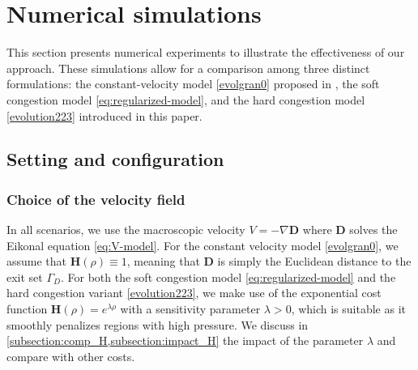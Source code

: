 \documentclass[final,reqno]{amsart}
\theoremstyle{plain}
\theoremstyle{definition}
\theoremstyle{remark}
\numberwithin{remark}{section}	%
\numberwithin{example}{section}	%
\newcommand{\de}{\mathbf{D}}
\newcommand{\he}{\mathbf{H}}
\begin{document}
 
\section{Numerical simulations}\label{sm_Hughes}
This section presents numerical experiments to illustrate the effectiveness of our approach. These simulations allow for a comparison among three distinct formulations: the constant-velocity model \eqref{evolgran0} proposed in \cite{ennaji2023prediction}, the soft congestion model \eqref{eq:regularized-model}, and the hard congestion model \eqref{evolution223} introduced in this paper.

\subsection{Setting and configuration}

\subsubsection{Choice of the velocity field}
In all scenarios, we use the macroscopic velocity $V = -\nabla\de$ where $\de$ solves the Eikonal equation \eqref{eq:V-model}. For the constant velocity model \eqref{evolgran0}, we assume that $\he(\rho) \equiv 1$, meaning that $\de$ is simply the Euclidean distance to the exit set $\Gamma_D$. 
For both the soft congestion model \eqref{eq:regularized-model} and the hard congestion variant \eqref{evolution223}, we make use of the exponential cost function $\he(\rho) = e^{\lambda \rho}$ with a sensitivity parameter $\lambda >0$, which is suitable as it smoothly penalizes regions with high pressure. We discuss in \cref{subsection:comp_H,subsection:impact_H} the impact of the parameter $\lambda$ and compare with other costs.
\end{document}
